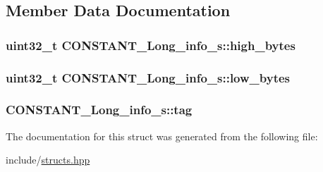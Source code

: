 \subsection{Member Data Documentation}
\hypertarget{structCONSTANT__Long__info__s_ae75d18eb47743d41d6a12698a0a9919e}{
\subsubsection[{high\+\_\+bytes}]{\setlength{\rightskip}{0pt plus 5cm}uint32\+\_\+t C\+O\+N\+S\+T\+A\+N\+T\+\_\+\+Long\+\_\+info\+\_\+s\+::high\+\_\+bytes}}\label{structCONSTANT__Long__info__s_ae75d18eb47743d41d6a12698a0a9919e}
\hypertarget{structCONSTANT__Long__info__s_a221f2f424e3fcec977b0375a1ce1986b}{
\subsubsection[{low\+\_\+bytes}]{\setlength{\rightskip}{0pt plus 5cm}uint32\+\_\+t C\+O\+N\+S\+T\+A\+N\+T\+\_\+\+Long\+\_\+info\+\_\+s\+::low\+\_\+bytes}}\label{structCONSTANT__Long__info__s_a221f2f424e3fcec977b0375a1ce1986b}
\hypertarget{structCONSTANT__Long__info__s_abdc4201e4bf9eac8c7d632983cccedd3}{
\subsubsection[{tag}]{ C\+O\+N\+S\+T\+A\+N\+T\+\_\+\+Long\+\_\+info\+\_\+s\+::tag}}\label{structCONSTANT__Long__info__s_abdc4201e4bf9eac8c7d632983cccedd3}


The documentation for this struct was generated from the following file\+:\begin{DoxyCompactItemize}
\item 
include/\hyperlink{structs_8hpp}{structs.\+hpp}\end{DoxyCompactItemize}
